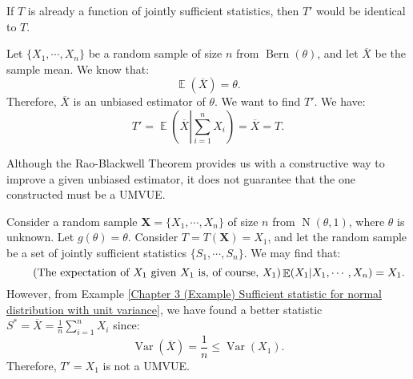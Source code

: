 \documentclass{huhtakm-template-book-v2}
\DeclareMathOperator{\E}{\mathbb{E}}
\DeclareMathOperator{\Var}{Var}
\DeclareMathOperator{\Bern}{Bern}
\DeclareMathOperator{\N}{N}
\begin{document}
    \begin{rem}
        If $T$ is already a function of jointly sufficient statistics, then $T'$ would be identical to $T$.
    \end{rem}
    \begin{eg}
        Let $\{X_{1},\cdots,X_{n}\}$ be a random sample of size $n$ from $\Bern(\theta)$, and let $\overline{X}$ be the sample mean. We know that:
        \begin{equation*}
            \E(\overline{X})=\theta.
        \end{equation*}
        Therefore, $\overline{X}$ is an unbiased estimator of $\theta$. We want to find $T'$. We have:
        \begin{equation*}
            T'=\E\left(\overline{X}\left|\sum_{i=1}^{n}X_{i}\right.\right)=\overline{X}=T.
        \end{equation*}
    \end{eg}
    \begin{rem}
        Although the Rao-Blackwell Theorem provides us with a constructive way to improve a given unbiased estimator, it does not guarantee that the one constructed must be a UMVUE.
    \end{rem}
    \begin{eg}
        Consider a random sample $\mathbf{X}=\{X_{1},\cdots,X_{n}\}$ of size $n$ from $\N(\theta,1)$, where $\theta$ is unknown. Let $g(\theta)=\theta$. Consider $T=T(\mathbf{X})=X_{1}$, and let the random sample be a set of jointly sufficient statistics $\{S_{1},\cdots,S_{n}\}$. We may find that:
        \begin{equation*}
            \tag{The expectation of $X_{1}$ given $X_{1}$ is, of course, $X_{1}$}
            \E(X_{1}|X_{1},\cdots,X_{n})=X_{1}.
        \end{equation*}
        However, from Example \ref{Chapter 3 (Example) Sufficient statistic for normal distribution with unit variance}, we have found a better statistic $S^{*}=\overline{X}=\frac{1}{n}\sum_{i=1}^{n}X_{i}$ since:
        \begin{equation*}
            \Var(\overline{X})=\frac{1}{n}\leq\Var(X_{1}).
        \end{equation*}
        Therefore, $T'=X_{1}$ is not a UMVUE.
    \end{eg}
\end{document}
